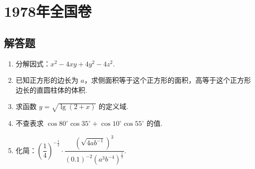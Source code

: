 \documentclass[UTF8,a4paper,oneside,11pt]{ctexbook}
\begin{document}
\mainmatter

\chapter{1978年全国卷}

\section{解答题}

\begin{problem}
\begin{enumerate}
\item 分解因式：\(x^{2}-4xy+4y^{2}-4z^{2}\).
\item 已知正方形的边长为 \(a\)，求侧面积等于这个正方形的面积，高等于这个正方形边长的直圆柱体的体积.
\item 求函数 \(y=\sqrt{\lg(2+x)}\) 的定义域.
\item 不查表求 \(\cos80^{\circ}\cos35^{\circ}+\cos10^{\circ}\cos55^{\circ}\) 的值.
\item 化简：\(\left(\dfrac{1}{4}\right)^{-\frac{1}{2}}\cdot\dfrac{\left(\sqrt{4ab^{-1}}\right)^{3}}{(0.1)^{-2}\left(a^{3}b^{-4}\right)^{\frac{1}{2}}}\).
\end{enumerate}
\end{problem}
\end{document}
